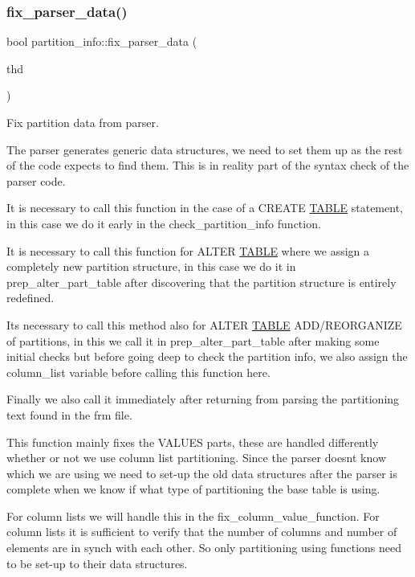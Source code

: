 \subsubsection{\texorpdfstring{fix\+\_\+parser\+\_\+data()}{fix\_parser\_data()}}
{\footnotesize\ttfamily bool partition\+\_\+info\+::fix\+\_\+parser\+\_\+data (\begin{DoxyParamCaption}\item[{T\+HD $\ast$}]{thd }\end{DoxyParamCaption})}

Fix partition data from parser.

The parser generates generic data structures, we need to set them up as the rest of the code expects to find them. This is in reality part of the syntax check of the parser code.

It is necessary to call this function in the case of a C\+R\+E\+A\+TE \mbox{\hyperlink{structTABLE}{T\+A\+B\+LE}} statement, in this case we do it early in the check\+\_\+partition\+\_\+info function.

It is necessary to call this function for A\+L\+T\+ER \mbox{\hyperlink{structTABLE}{T\+A\+B\+LE}} where we assign a completely new partition structure, in this case we do it in prep\+\_\+alter\+\_\+part\+\_\+table after discovering that the partition structure is entirely redefined.

It\textquotesingle{}s necessary to call this method also for A\+L\+T\+ER \mbox{\hyperlink{structTABLE}{T\+A\+B\+LE}} A\+D\+D/\+R\+E\+O\+R\+G\+A\+N\+I\+ZE of partitions, in this we call it in prep\+\_\+alter\+\_\+part\+\_\+table after making some initial checks but before going deep to check the partition info, we also assign the column\+\_\+list variable before calling this function here.

Finally we also call it immediately after returning from parsing the partitioning text found in the frm file.

This function mainly fixes the V\+A\+L\+U\+ES parts, these are handled differently whether or not we use column list partitioning. Since the parser doesn\textquotesingle{}t know which we are using we need to set-\/up the old data structures after the parser is complete when we know if what type of partitioning the base table is using.

For column lists we will handle this in the fix\+\_\+column\+\_\+value\+\_\+function. For column lists it is sufficient to verify that the number of columns and number of elements are in synch with each other. So only partitioning using functions need to be set-\/up to their data structures.


